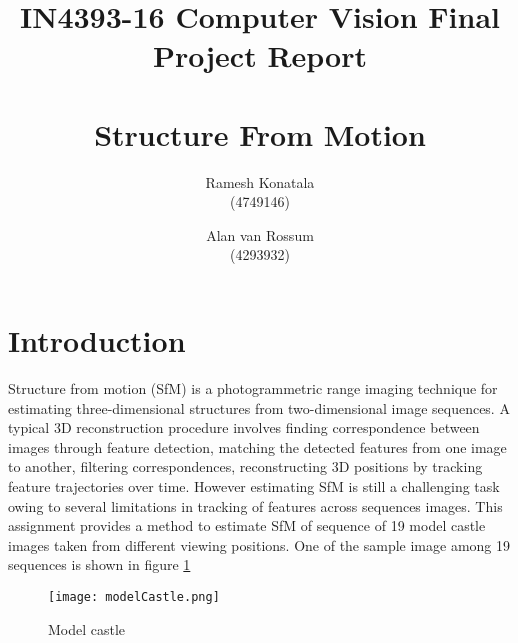 \documentclass[11pt,twocolumn,pdftex]{article}
\begin{document}
\title{IN4393-16 Computer Vision Final Project Report \\ \\ \large Structure From Motion}
\author{\normalsize Ramesh Konatala\\
\normalsize(4749146)\\
\and
\normalsize Alan van Rossum\\
\normalsize (4293932)\\
}

\maketitle

\section{Introduction}
Structure from motion (SfM) is a photogrammetric range imaging technique for estimating three-dimensional structures from two-dimensional image sequences. A typical 3D reconstruction procedure involves finding correspondence between images through feature detection, matching the detected features from one image to another, filtering correspondences, reconstructing 3D positions by tracking feature trajectories over time. However estimating SfM is still a challenging task owing to several limitations in tracking of features across sequences images. This assignment provides a method to estimate SfM of sequence of 19 model castle images taken from different viewing positions. One of the sample image among 19 sequences is shown in figure \ref{fig:modelCastle}

\begin{figure}[h]
	\centering 
    \texttt{[image: modelCastle.png]}
    \caption{Model castle}
    \label{fig:modelCastle}
\end{figure}


\end{document}
